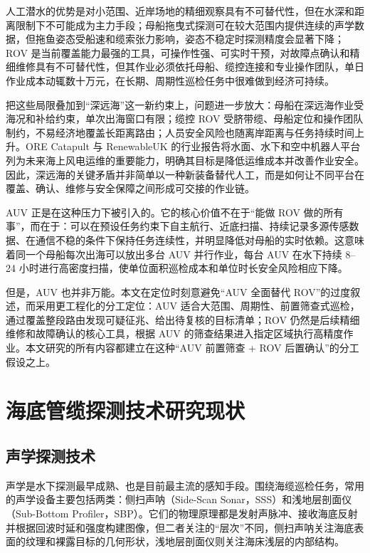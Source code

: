 人工潜水的优势是对小范围、近岸场地的精细观察具有不可替代性，但在水深和距离限制下不可能成为主力手段；母船拖曳式探测可在较大范围内提供连续的声学数据，但拖鱼姿态受船速和缆索张力影响，姿态不稳定时探测精度会显著下降；ROV 是当前覆盖能力最强的工具，可操作性强、可实时干预，对故障点确认和精细维修具有不可替代性，但其作业必须依托母船、缆控连接和专业操作团队，单日作业成本动辄数十万元，在长期、周期性巡检任务中很难做到经济可持续。

把这些局限叠加到``深远海''这一新约束上，问题进一步放大：母船在深远海作业受海况和补给约束，单次出海窗口有限；缆控 ROV 受脐带缆、母船定位和操作团队制约，不易经济地覆盖长距离路由；人员安全风险也随离岸距离与任务持续时间上升。ORE Catapult 与 RenewableUK 的行业报告将水面、水下和空中机器人平台列为未来海上风电运维的重要能力，明确其目标是降低运维成本并改善作业安全\cite{orecatapult2025ras}。因此，深远海的关键矛盾并非简单以一种新装备替代人工，而是如何让不同平台在覆盖、确认、维修与安全保障之间形成可交接的作业链。

AUV 正是在这种压力下被引入的。它的核心价值不在于``能做 ROV 做的所有事''，而在于：可以在预设任务约束下自主航行、近底扫描、持续记录多源传感数据、在通信不稳的条件下保持任务连续性，并明显降低对母船的实时依赖。这意味着同一个母船每次出海可以放出多台 AUV 并行作业，每台 AUV 在水下持续 8--24 小时进行高密度扫描，使单位面积巡检成本和单位时长安全风险相应下降。

但是，AUV 也并非万能。本文在定位时刻意避免``AUV 全面替代 ROV''的过度叙述，而采用更工程化的分工定位：AUV 适合大范围、周期性、前置筛查式巡检，通过覆盖整段路由发现可疑征兆、给出待复核的目标清单；ROV 仍然是后续精细维修和故障确认的核心工具，根据 AUV 的筛查结果进入指定区域执行高精度作业。本文研究的所有内容都建立在这种``AUV 前置筛查 + ROV 后置确认''的分工假设之上。

\section{海底管缆探测技术研究现状}\label{sec:ch01-1-2}

\subsection{声学探测技术}\label{sec:ch01-1-2-1}

声学是水下探测最早成熟、也是目前最主流的感知手段。围绕海缆巡检任务，常用的声学设备主要包括两类：侧扫声呐（Side-Scan Sonar，SSS）和浅地层剖面仪（Sub-Bottom Profiler，SBP）。它们的物理原理都是发射声脉冲、接收海底反射并根据回波时延和强度构建图像，但二者关注的``层次''不同，侧扫声呐关注海底表面的纹理和裸露目标的几何形状，浅地层剖面仪则关注海床浅层的内部结构。

